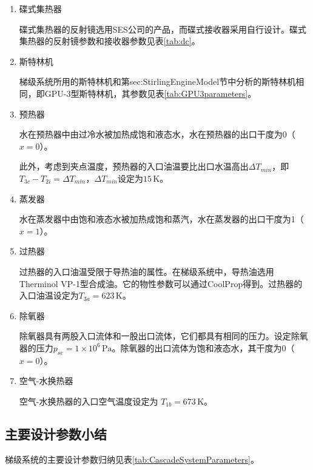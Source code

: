 \begin{enumerate}[label=(\arabic*)]
\item 碟式集热器

碟式集热器的反射镜选用SES公司的产品，而碟式接收器采用自行设计。碟式集热器的反射镜参数和接收器参数见表\ref{tab:dc}。

\item 斯特林机

梯级系统所用的斯特林机和第{sec:StirlingEngineModel}节中分析的斯特林机相同，即GPU-3型斯特林机，其参数见表\ref{tab:GPU3parameters}。

\item 预热器

水在预热器中由过冷水被加热成饱和液态水，水在预热器的出口干度为0（$x = 0$）。

此外，考虑到夹点温度，预热器的入口油温要比出口水温高出$\Delta T_{min}$，即$T_{3c} - T_{2i} = \Delta T_{min}$，$\Delta T_{min}$设定为$15\,\mathrm{K}$。

\item 蒸发器

水在蒸发器中由饱和液态水被加热成饱和蒸汽，水在蒸发器的出口干度为1（$x = 1$）。

\item 过热器

过热器的入口油温受限于导热油的属性。在梯级系统中，导热油选用Therminol VP-1型合成油。它的物性参数可以通过CoolProp得到。过热器的入口油温设定为$T_{3a} = 623\,\mathrm{K}$。

\item 除氧器

除氧器具有两股入口流体和一股出口流体，它们都具有相同的压力。设定除氧器的压力$p_{se} = 1\times10^6\,\mathrm{Pa}$。除氧器的出口流体为饱和液态水，其干度为0（$x = 0$）。

\item 空气-水换热器

空气-水换热器的入口空气温度设定为 $T_{1b} = 673\,\mathrm{K}$。
\end{enumerate}

\subsection{主要设计参数小结}
梯级系统的主要设计参数归纳见表\ref{tab:CascadeSystemParameters}。

